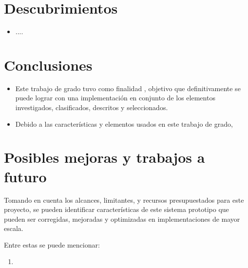\section{Descubrimientos}
\begin{itemize}
    \item ....
\end{itemize}
\section{Conclusiones}
\begin{itemize}
    \item Este trabajo de grado tuvo como finalidad , objetivo que definitivamente se puede lograr con una implementación en conjunto de los elementos investigados, clasificados, descritos y seleccionados.
    
    \item Debido a las características y elementos usados en este trabajo de grado, 
\end{itemize}



\section{Posibles mejoras y trabajos a futuro}

Tomando en cuenta los alcances, limitantes, y recursos presupuestados para este proyecto, se pueden identificar características de este sistema prototipo que pueden ser corregidas, mejoradas y optimizadas en implementaciones de mayor escala.

Entre estas se puede mencionar:

\begin{enumerate}
   \item 
\end{enumerate} 
